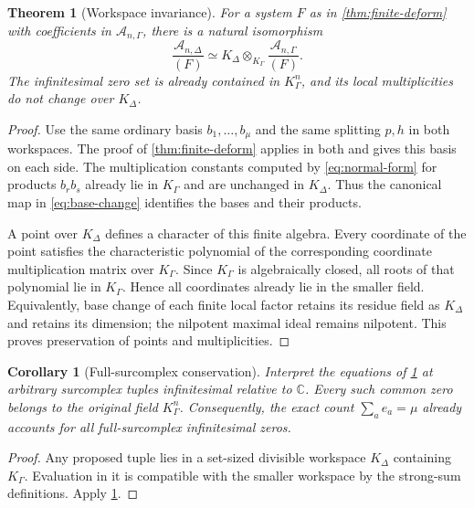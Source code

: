 \documentclass[11pt,letterpaper]{article}
\newtheorem{theorem}{Theorem}[section]
\newtheorem{corollary}[corollary]{Corollary}
\theoremstyle{definition}
\theoremstyle{remark}
\newcommand{\C}{\mathbb C}
\newcommand{\A}{\mathscr A}
\numberwithin{equation}{section}
\begin{document}
\begin{theorem}[Workspace invariance]\label{thm:workspace}
For a system $F$ as in \cref{thm:finite-deform} with coefficients in $\A_{n,\Gamma}$, there is a natural isomorphism
\begin{equation}\label{eq:base-change}
 \frac{\A_{n,\Delta}}{(F)}
 \simeq
 K_\Delta\otimes_{K_\Gamma}
 \frac{\A_{n,\Gamma}}{(F)}.
\end{equation}
The infinitesimal zero set is already contained in $K_\Gamma^n$, and its local multiplicities do not change over $K_\Delta$.
\end{theorem}
\begin{proof}
Use the same ordinary basis $b_1,\ldots,b_\mu$ and the same splitting $p,h$ in both workspaces. The proof of \cref{thm:finite-deform} applies in both and gives this basis on each side. The multiplication constants computed by \eqref{eq:normal-form} for products $b_rb_s$ already lie in $K_\Gamma$ and are unchanged in $K_\Delta$. Thus the canonical map in \eqref{eq:base-change} identifies the bases and their products.

A point over $K_\Delta$ defines a character of this finite algebra. Every coordinate of the point satisfies the characteristic polynomial of the corresponding coordinate multiplication matrix over $K_\Gamma$. Since $K_\Gamma$ is algebraically closed, all roots of that polynomial lie in $K_\Gamma$. Hence all coordinates already lie in the smaller field. Equivalently, base change of each finite local factor retains its residue field as $K_\Delta$ and retains its dimension; the nilpotent maximal ideal remains nilpotent. This proves preservation of points and multiplicities.
\end{proof}

\begin{corollary}[Full-surcomplex conservation]\label{cor:full-sc}
Interpret the equations of \cref{thm:workspace} at arbitrary surcomplex tuples infinitesimal relative to $\C$. Every such common zero belongs to the original field $K_\Gamma^n$. Consequently, the exact count $\sum_a e_a=\mu$ already accounts for all full-surcomplex infinitesimal zeros.
\end{corollary}
\begin{proof}
Any proposed tuple lies in a set-sized divisible workspace $K_\Delta$ containing $K_\Gamma$. Evaluation in it is compatible with the smaller workspace by the strong-sum definitions. Apply \cref{thm:workspace}.
\end{proof}
\end{document}
